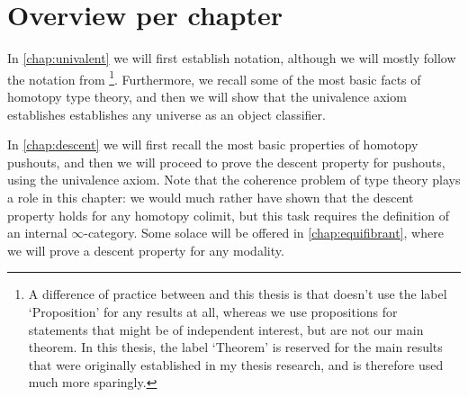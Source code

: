 \section{Overview per chapter}
In \cref{chap:univalent} we will first establish notation, although we will mostly follow the notation from \cite{hottbook}\footnote{A difference of practice between \cite{hottbook} and this thesis is that \cite{hottbook} doesn't use the label `Proposition' for any results at all, whereas we use propositions for statements that might be of independent interest, but are not our main theorem. In this thesis, the label `Theorem' is reserved for the main results that were originally established in my thesis research, and is therefore used much more sparingly.}. Furthermore, we recall some of the most basic facts of homotopy type theory, and then we will show that the univalence axiom establishes establishes any universe as an object classifier. 

In \cref{chap:descent} we will first recall the most basic properties of homotopy pushouts, and then we will proceed to prove the descent property for pushouts, using the univalence axiom. Note that the coherence problem of type theory plays a role in this chapter: we would much rather have shown that the descent property holds for any homotopy colimit, but this task requires the definition of an internal $\infty$-category. Some solace will be offered in \cref{chap:equifibrant}, where we will prove a descent property for any modality.

